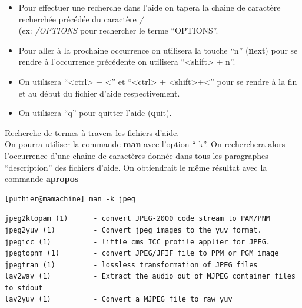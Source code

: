 \documentclass[10pt, xcolor=dvipsnames]{beamer}
\begin{document}
\begin{frame}[fragile]

  \begin{itemize}
    \item Pour effectuer une recherche dans l'aide on tapera la chaine de caractère recherchée précédée du caractère \textit{/} \\(ex: \textit{/OPTIONS} pour rechercher le terme ``OPTIONS''. 
    \item Pour aller à la prochaine occurrence on utilisera la touche ``n'' (\textbf{n}ext) pour se rendre à l'occurrence précédente on utilisera ``<shift> + n''.
    \item On utilisera ``<ctrl> + <'' et ``<ctrl> + <shift>+<'' pour se rendre à la fin et au début du fichier d'aide respectivement.
    \item On utilisera ``q'' pour quitter l'aide (\textbf{q}uit).
    \end{itemize}

\end{frame}


\begin{frame}[fragile]
    
Recherche de termes à travers les fichiers d'aide.\\

    \vspace{0.8mm}
    On pourra utiliser la commande \textbf{man} avec l'option ``-k''. On recherchera alors l'occurrence d'une chaîne de caractères donnée dans tous les paragraphes ``description'' des fichiers d'aide. On obtiendrait le même résultat avec la commande \textbf{apropos} 
   
 
    \begin{verbatim}
[puthier@mamachine] man -k jpeg
    \end{verbatim}
    \tiny
    \begin{verbatim}
jpeg2ktopam (1)      - convert JPEG-2000 code stream to PAM/PNM
jpeg2yuv (1)         - Convert jpeg images to the yuv format.
jpegicc (1)          - little cms ICC profile applier for JPEG.
jpegtopnm (1)        - convert JPEG/JFIF file to PPM or PGM image
jpegtran (1)         - lossless transformation of JPEG files
lav2wav (1)          - Extract the audio out of MJPEG container files to stdout
lav2yuv (1)          - Convert a MJPEG file to raw yuv
    \end{verbatim}

    \normalsize


\end{frame}
\end{document}
